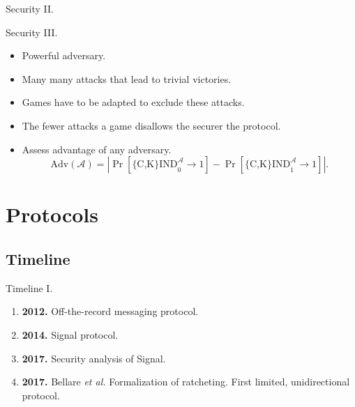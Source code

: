 \documentclass{beamer}
\renewcommand{\t}{\text}
\begin{document}
\begin{frame}{Security II.}
  \begin{figure}[ht]
      \centering
      \setlength{\fboxsep}{10pt}
      \scalebox{0.7}{%
      \fbox{%
        
      }
    }
  \end{figure}

  \begin{figure}[ht]
      \centering
      \setlength{\fboxsep}{10pt}
      \scalebox{0.7}{%
      \fbox{%
        
      }
    }
  \end{figure}
\end{frame}

\begin{frame}{Security III.}
  \begin{itemize}
  \item Powerful adversary.
  \item Many many attacks that lead to trivial victories.
  \item Games have to be adapted to exclude these attacks.
  \item The fewer attacks a game disallows the securer the protocol.
  \item Assess advantage of any adversary.
\[
  \t{Adv}(\mathcal{A}) = \left| \Pr \left[ \t{\{C,K\}IND}_0^\mathcal{A} \rightarrow 1 \right] -
                                \Pr \left[ \t{\{C,K\}IND}_1^\mathcal{A} \rightarrow 1 \right]
                         \right|.
\]
  \end{itemize}
\end{frame}

\section{Protocols}
\label{sec:protocols}

\subsection{Timeline}
\label{sec:timeline}

\begin{frame}{Timeline I.}
  \begin{enumerate}
  \item \textbf{2012.} Off-the-record messaging protocol.
  \item \textbf{2014.} Signal protocol.
  \item \textbf{2017.} Security analysis of Signal.
  \item \textbf{2017.} Bellare {\em et al.} Formalization of ratcheting. First
    limited, unidirectional protocol.
  \end{enumerate}
\end{frame}
\end{document}
